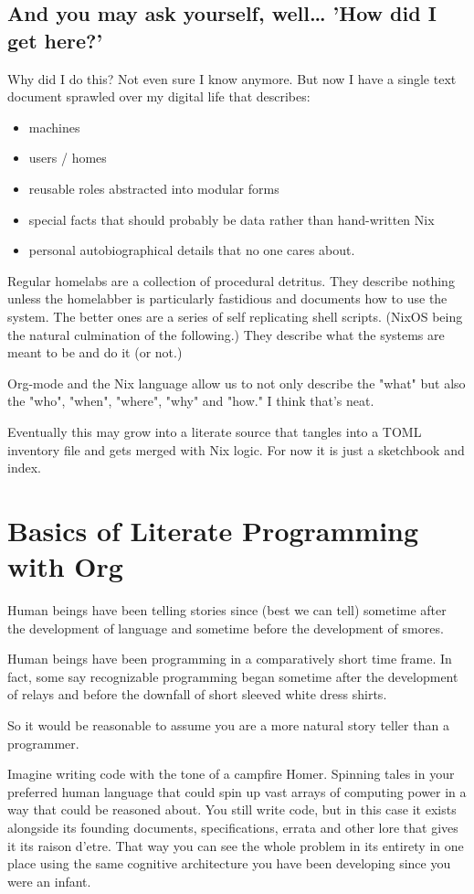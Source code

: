 \documentclass[11pt]{article}
\begin{document}
\subsection{And you may ask yourself, well\ldots{} 'How did I get here?'}
\label{sec:orgf6592b5}
Why did I do this? Not even sure I know anymore. But now I have a single text document sprawled over my digital life that describes:
\begin{itemize}
\item machines
\item users / homes
\item reusable roles abstracted into modular forms
\item special facts that should probably be data rather than hand-written Nix
\item personal autobiographical details that no one cares about.
\end{itemize}

Regular homelabs are a collection of procedural detritus. They describe nothing unless the homelabber is particularly fastidious and documents how to use the system. The better ones are a series of self replicating shell scripts. (NixOS being the natural culmination of the following.) They describe what the systems are meant to be and do it (or not.)

Org-mode and the Nix language allow us to not only describe the "what" but also the "who", "when", "where", "why" and "how." I think that's neat. 

Eventually this may grow into a literate source that tangles into a TOML
inventory file and gets merged with Nix logic. For now it is just a sketchbook
and index.
\section{Basics of Literate Programming with Org}
\label{sec:org2ecf68d}
Human beings have been telling stories since (best we can tell) sometime after the development of language and sometime before the development of smores. 

Human beings have been programming in a comparatively short time frame. In fact, some say recognizable programming began sometime after the development of relays and before the downfall of short sleeved white dress shirts.

So it would be reasonable to assume you are a more natural story teller than a programmer.

Imagine writing code with the tone of a campfire Homer. Spinning tales in your preferred human language that could spin up vast arrays of computing power in a way that could be reasoned about. You still write code, but in this case it exists alongside its founding documents, specifications, errata and other lore that gives it its raison d'etre. That way you can see the whole problem in its entirety in one place using the same cognitive architecture you have been developing since you were an infant. 
\end{document}
